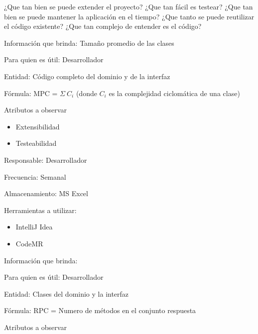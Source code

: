  {
    \pregunta ¿Que tan bien se puede extender el proyecto?
    \pregunta ¿Que tan fácil es testear?
    \pregunta ¿Que tan bien se puede mantener la aplicación en el tiempo?
    \pregunta ¿Que tanto se puede reutilizar el código existente?
    \pregunta ¿Que tan complejo de entender es el código?
} {
     {
        \item Información que brinda: Tamaño promedio de las clases
        \item Para quien es útil: Desarrollador
        \item Entidad: Código completo del dominio y de la interfaz
        \item Fórmula: MPC = $\Sigma\ C_i$ (donde $C_i$ es la complejidad ciclomática de una clase)
        \item Atributos a observar
            \begin{itemize}
                \item Extensibilidad
                \item Testeabilidad
            \end{itemize}
        \item Responsable: Desarrollador
        \item Frecuencia: Semanal
        \item Almacenamiento: MS Excel
        \item Herramientas a utilizar:
        \begin{itemize}
            \item IntelliJ Idea
            \item CodeMR
        \end{itemize}
    }
     {
        \item Información que brinda: 
        \item Para quien es útil: Desarrollador
        \item Entidad: Clases del dominio y la interfaz
        \item Fórmula: RPC = Numero de métodos en el conjunto respuesta
        \item Atributos a observar
            \begin{itemize}

\end{itemize}}}
